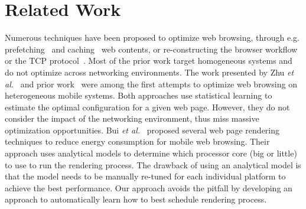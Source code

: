 \section{Related Work}

Numerous techniques have been proposed to optimize web browsing, through e.g.
prefetching~\cite{wang2012far} and caching~\cite{qian2012web} web contents, 
or re-constructing the browser workflow~\cite{zhao2015energy,mai2012case} or the TCP protocol~\cite{Xie:2017:AMW:3081333.3081367}. Most of the
prior work target homogeneous systems and do not optimize across networking environments. The work presented by Zhu \emph{et
al.}~\cite{YZhu13} and prior work~\cite{ren2016optimise} were among the first attempts to optimize web browsing on heterogeneous mobile
systems. Both approaches use statistical learning to estimate the optimal configuration for a given web page. However, they do not consider
the impact of the networking environment, thus miss massive optimization opportunities. Bui \emph{et al.}~\cite{bui2015rethinking} proposed
several web page rendering techniques to reduce energy consumption for mobile web browsing. Their approach uses analytical models to
determine which processor core (big or little) to use to run the rendering process. The drawback of using an analytical model is that the
model needs to be manually re-tuned for each individual platform to achieve the best performance. Our approach avoids the pitfall by
developing an approach to automatically learn how to best schedule rendering process. 



